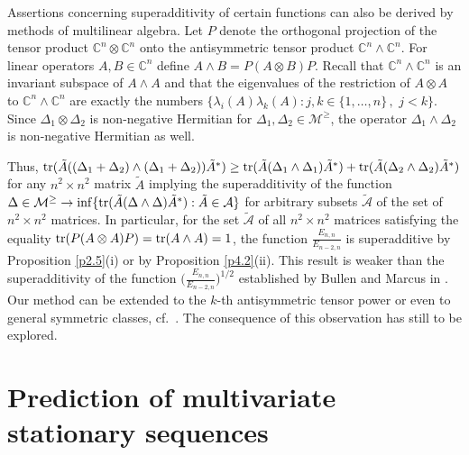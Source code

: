 \documentclass{amsart}
\begin{document}
Assertions concerning superadditivity of certain functions can also be derived by methods of multilinear algebra. Let $P$ denote the orthogonal projection of the tensor product ${\mathbb C}^n \otimes {\mathbb C}^n$ onto the antisymmetric tensor product ${\mathbb C}^n \wedge {\mathbb C}^n$. For linear operators $A,B \in {\mathbb C}^n$ define $A \wedge B = P (A \otimes B) P$. Recall that ${\mathbb C}^n \wedge {\mathbb C}^n$ is an invariant subspace of $A \wedge A$ and that the eigenvalues of the restriction of $A \otimes A$ to ${\mathbb C}^n \wedge {\mathbb C}^n$ are exactly the numbers $\{ \lambda_i (A)\lambda_k (A) : j,k \in\{ 1,\ldots,n \} \, , \,\, j < k \}$. Since $\Delta_1 \otimes \Delta_2$ is non-negative Hermitian for $\Delta_1,\Delta_2 \in {\mathcal M}^\geq$, the operator $\Delta_1 \wedge \Delta_2$ is non-negative Hermitian as well. 

Thus, ${\rm tr}(\tilde{A} ((\Delta_1+\Delta_2) \wedge (\Delta_1+\Delta_2)) \tilde{A}^* ) \geq {\rm tr}(\tilde{A} (\Delta_1 \wedge \Delta_1) \tilde{A}^*) + {\rm tr}(\tilde{A} (\Delta_2 \wedge \Delta_2) \tilde{A}^*)$ for any $n^2 \times n^2$ matrix $\tilde{A}$ implying the superadditivity of the function $\Delta \in {\mathcal M}^\geq \to \inf \{ {\rm tr}(\tilde{A} (\Delta \wedge \Delta) \tilde{A}^*): \tilde{A} \in {\mathcal A} \}$ for arbitrary subsets $\tilde{{\mathcal A}}$ of the set of $n^2 \times n^2$ matrices. In particular, for the set $\tilde{{\mathcal A}}$ of all $n^2 \times n^2$ matrices satisfying the equality ${\rm tr}(P (A \otimes A) P) = {\rm tr}(A \wedge A)=1$, the function $\frac{E_{n,n}}{E_{n-2,n}}$ is superadditive by Proposition \ref{p2.5}(i) or by Proposition \ref{p4.2}(ii). This result is weaker than the superadditivity of the function  $\Big( \frac{E_{n,n}}{E_{n-2,n}} \Big)^{1/2}$ established by Bullen and Marcus in \cite{BM}.  Our method can be extended to the $k$-th antisymmetric tensor power or even to general symmetric classes, cf.~\cite[Sections 2.3, 2.4]{M}. The consequence of this observation has still to be explored. 



\section{Prediction of multivariate stationary sequences}
\label{s6}       
\end{document}
